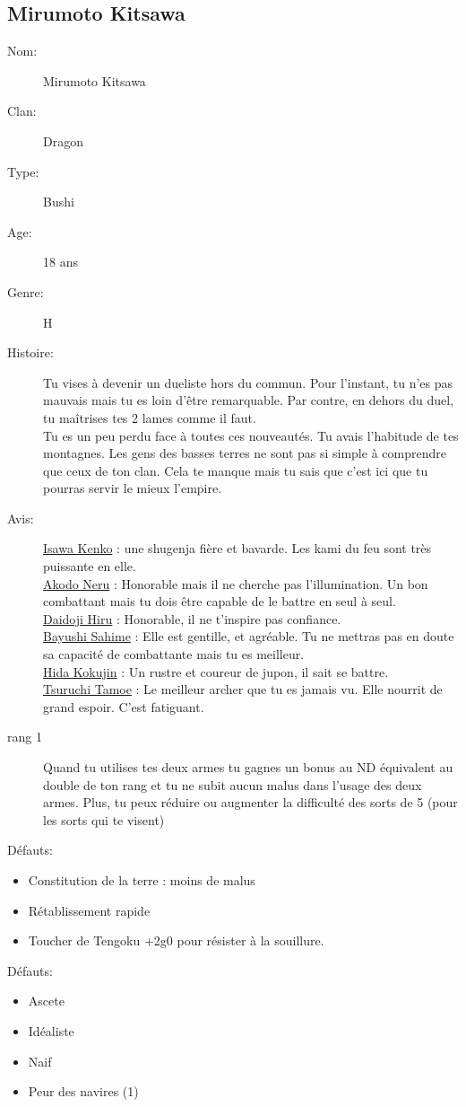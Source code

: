 \documentclass[oneside,12pt]{book}
\begin{document}
\begin{flushleft}
\clearpage

\section{Mirumoto Kitsawa}
\begin{description}
\item[Nom:]{Mirumoto Kitsawa}
\item[Clan:]{Dragon}
\item[Type:]{Bushi}
\item[Age:]{18 ans}
\item[Genre:]{H}
\item[Histoire:]{
Tu vises à devenir un dueliste hors du commun. Pour l'instant, tu n'es pas mauvais mais tu es loin d'être remarquable. Par contre, en dehors du duel, tu maîtrises tes 2 lames comme il faut.\\
Tu es un peu perdu face à toutes ces nouveautés. Tu avais l'habitude de tes montagnes. Les gens des basses terres ne sont pas si simple à comprendre que ceux de ton clan. Cela te manque mais tu sais que c'est ici que tu pourras servir le mieux l'empire. 
\vspace{0.2cm}
}
\item[Avis:]{
\underline{Isawa Kenko} : une shugenja fière et bavarde. Les kami du feu sont très puissante en elle.\\
\underline{Akodo Neru} : Honorable mais il ne cherche pas l'illumination. Un bon combattant mais tu dois être capable de le battre en seul à seul.\\
\underline{Daidoji Hiru} : Honorable, il ne t'inspire pas confiance.\\
\underline{Bayushi Sahime} : Elle est gentille, et agréable. Tu ne mettras pas en doute sa capacité de combattante mais tu es meilleur. \\
\underline{Hida Kokujin} : Un rustre et coureur de jupon, il sait se battre. \\
\underline{Tsuruchi Tamoe} : Le meilleur archer que tu es jamais vu. Elle nourrit de grand espoir. C'est fatiguant. \\
}
\item[rang 1]{
Quand tu utilises tes deux armes tu gagnes un bonus au ND équivalent au double de ton rang et tu ne subit aucun malus dans l'usage des deux armes. Plus, tu peux réduire ou augmenter la difficulté des sorts de 5 (pour les sorts qui te visent)
}
\end{description}
\vspace{0.2cm}
Défauts:
\begin{itemize}
\item Constitution de la terre : moins de malus
\item Rétablissement rapide
\item Toucher de Tengoku +2g0 pour résister à la souillure.
\end{itemize}
Défauts:
\begin{itemize}
\item Ascete
\item Idéaliste
\item Naif
\item Peur des navires (1)
\end{itemize}


\end{flushleft}
\end{document}
